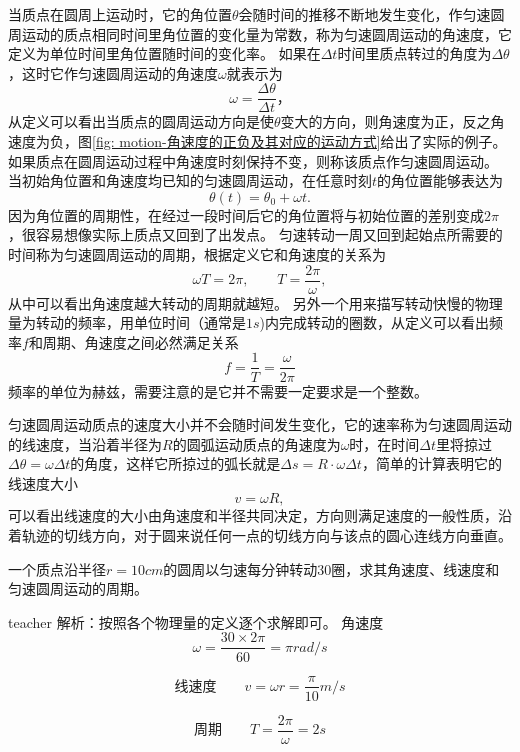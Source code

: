 当质点在圆周上运动时，它的角位置$\theta$会随时间的推移不断地发生变化，作匀速圆周运动的质点相同时间里角位置的变化量为常数，称为匀速圆周运动的{\heiti 角速度}，它定义为单位时间里角位置随时间的变化率。
如果在$\Delta t$时间里质点转过的角度为$\Delta \theta$，这时它作匀速圆周运动的角速度$\omega$就表示为
\begin{equation}
\omega = \frac{\Delta\theta}{\Delta t}，
\end{equation}
从定义可以看出当质点的圆周运动方向是使$\theta$变大的方向，则角速度为正，反之角速度为负，图\ref{fig: motion-角速度的正负及其对应的运动方式}给出了实际的例子。
如果质点在圆周运动过程中角速度时刻保持不变，则称该质点作{\heiti 匀速圆周运动}。
当初始角位置和角速度均已知的匀速圆周运动，在任意时刻$t$的角位置能够表达为
\begin{equation}
\theta(t) = \theta_0+\omega t.
\end{equation}
因为角位置的周期性，在经过一段时间后它的角位置将与初始位置的差别变成$2\pi$，很容易想像实际上质点又回到了出发点。
匀速转动一周又回到起始点所需要的时间称为匀速圆周运动的{\heiti 周期}，根据定义它和角速度的关系为
\begin{equation}
\omega T = 2\pi,\qquad T = \frac{2\pi}{\omega},
\end{equation}
从中可以看出角速度越大转动的周期就越短。
另外一个用来描写转动快慢的物理量为转动的{\heiti 频率}，用单位时间（通常是$1\unit{s}$)内完成转动的圈数，从定义可以看出频率$f$和周期、角速度之间必然满足关系
\begin{equation}
f = \frac{1}{T} = \frac{\omega}{2\pi}
\end{equation}
频率的单位为{\heiti 赫兹}，需要注意的是它并不需要一定要求是一个整数。


匀速圆周运动质点的速度大小并不会随时间发生变化，它的速率称为匀速圆周运动的{\heiti 线速度}，当沿着半径为$R$的圆弧运动质点的角速度为$\omega$时，在时间$\Delta t$里将掠过$\Delta \theta = \omega \Delta t$的角度，这样它所掠过的弧长就是$\Delta s = R \cdot \omega\Delta t$，简单的计算表明它的线速度大小
\begin{equation}
v = \omega R,
\end{equation}
可以看出线速度的大小由角速度和半径共同决定，方向则满足速度的一般性质，沿着轨迹的切线方向，对于圆来说任何一点的切线方向与该点的圆心连线方向垂直。




\begin{example}
一个质点沿半径$r=10\unit{cm}$的圆周以匀速每分钟转动30圈，求其角速度、线速度和匀速圆周运动的周期。
\begin{taggedblock}{teacher}
\newline
解析：按照各个物理量的定义逐个求解即可。
角速度
\[
\omega = \frac{30\times 2\pi}{60} = \pi\unit{rad/s}
\]

\[\text{线速度}\qquad v = \omega r = \frac{\pi}{10}\unit{m/s}\]

\[
\text{周期}\qquad T = \frac{2\pi}{\omega} = 2\unit{s}
\]
\end{taggedblock}
\end{example}

